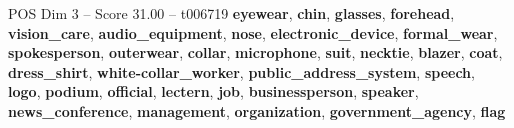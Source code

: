 \begin{textsample}{POS Dim 3 – Score 31.00 – t006719}  \label{ex:f3_pos_017}
\textbf{eyewear}, \textbf{chin}, \textbf{glasses}, \textbf{forehead}, \textbf{vision\_care}, \textbf{audio\_equipment}, \textbf{nose}, \textbf{electronic\_device}, \textbf{formal\_wear}, \textbf{spokesperson}, \textbf{outerwear}, \textbf{collar}, \textbf{microphone}, \textbf{suit}, \textbf{necktie}, \textbf{blazer}, \textbf{coat}, \textbf{dress\_shirt}, \textbf{white-collar\_worker}, \textbf{public\_address\_system}, \textbf{speech}, \textbf{logo}, \textbf{podium}, \textbf{official}, \textbf{lectern}, \textbf{job}, \textbf{businessperson}, \textbf{speaker}, \textbf{news\_conference}, \textbf{management}, \textbf{organization}, \textbf{government\_agency}, \textbf{flag}

\end{textsample}
